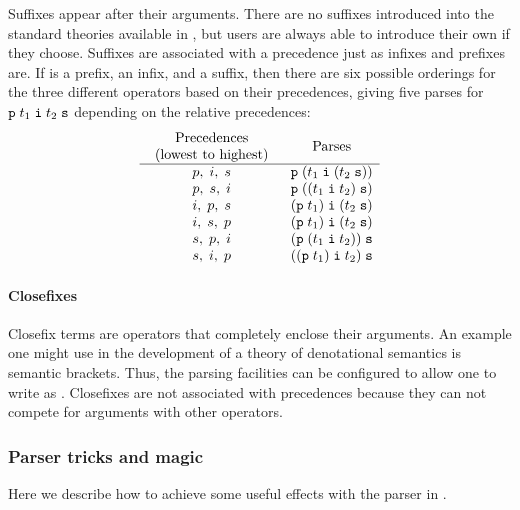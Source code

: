 Suffixes appear after their arguments.  There are no suffixes
introduced into the standard theories available in \HOL{}, but users
are always able to introduce their own if they choose.  Suffixes are
associated with a precedence just as infixes and prefixes are.
If  is a prefix,  an infix, and  a
suffix, then there are six possible orderings for the three different
operators based on their precedences, giving five parses for
$\holtxt{p}\; t_1\; \holtxt{i}\; t_2\; \holtxt{s}$ depending on the
relative precedences:
\[
\begin{array}{cl}
\mbox{\begin{tabular}{c}Precedences\\(lowest to highest)\end{tabular}} &
\multicolumn{1}{c}{\mbox{Parses}}\\
\hline
p,\;i,\;s & \holtxt{p}\;(t_1\;\holtxt{i}\;(t_2\;\holtxt{s}))\\
p,\;s,\;i & \holtxt{p}\;((t_1\;\holtxt{i}\;t_2)\;\holtxt{s})\\
i,\;p,\;s & (\holtxt{p}\;t_1)\;\holtxt{i}\;(t_2\;\holtxt{s})\\
i,\;s,\;p & (\holtxt{p}\;t_1)\;\holtxt{i}\;(t_2\;\holtxt{s})\\
s,\;p,\;i & (\holtxt{p}\;(t_1\;\holtxt{i}\;t_2))\;\holtxt{s}\\
s,\;i,\;p & ((\holtxt{p}\;t_1)\;\holtxt{i}\;t_2)\;\holtxt{s}\\
\end{array}
\]

\paragraph{Closefixes}

Closefix terms are operators that completely enclose their arguments.
An example one might use in the development of a theory of
denotational semantics is semantic brackets.  Thus, the \HOL{} parsing
facilities can be configured to allow one to write 
as \holtxt{[| x |]}.  Closefixes are not associated with precedences
because they can not compete for arguments with other operators.


\subsubsection{Parser tricks and magic}

Here we describe how to achieve some useful effects with the
parser in \HOL{}.

